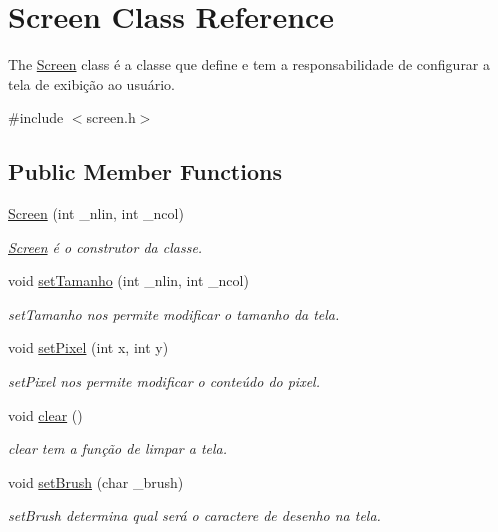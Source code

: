 \hypertarget{class_screen}{}\section{Screen Class Reference}
\label{class_screen}


The \mbox{\hyperlink{class_screen}{Screen}} class é a classe que define e tem a responsabilidade de configurar a tela de exibição ao usuário.  




{\ttfamily \#include $<$screen.\+h$>$}

\subsection*{Public Member Functions}
\begin{DoxyCompactItemize}
\item 
\mbox{\hyperlink{class_screen_a6c21beca43d25854d8674445127ef2eb}{Screen}} (int \+\_\+nlin, int \+\_\+ncol)
\begin{DoxyCompactList}\small\item\em \mbox{\hyperlink{class_screen}{Screen}} é o construtor da classe. \end{DoxyCompactList}\item 
void \mbox{\hyperlink{class_screen_a88e90322ba2f1623b660c424be1c8f84}{set\+Tamanho}} (int \+\_\+nlin, int \+\_\+ncol)
\begin{DoxyCompactList}\small\item\em set\+Tamanho nos permite modificar o tamanho da tela. \end{DoxyCompactList}\item 
void \mbox{\hyperlink{class_screen_ae6bea81c57a22d226507c3c26fa95ee0}{set\+Pixel}} (int x, int y)
\begin{DoxyCompactList}\small\item\em set\+Pixel nos permite modificar o conteúdo do pixel. \end{DoxyCompactList}\item 
void \mbox{\hyperlink{class_screen_a35e74266b2a04e37b354ceff7a5f1031}{clear}} ()
\begin{DoxyCompactList}\small\item\em clear tem a função de limpar a tela. \end{DoxyCompactList}\item 
void \mbox{\hyperlink{class_screen_aebc4eb6cb5acf15a0f04c1494622ab23}{set\+Brush}} (char \+\_\+brush)
\begin{DoxyCompactList}\small\item\em set\+Brush determina qual será o caractere de desenho na tela. \end{DoxyCompactList}\end{DoxyCompactItemize}
